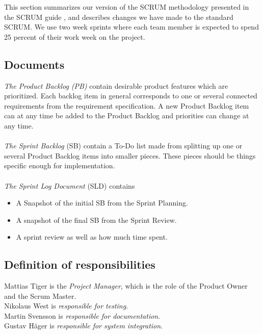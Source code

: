
This section summarizes our version of the SCRUM methodology presented in the SCRUM guide \cite{scrumGuide}, and describes changes we have made to the standard SCRUM. We use two week sprints where each team member is expected to spend 25 percent of their work week on the project.   

\subsection{Documents}
\emph{The Product Backlog (PB)} contain desirable product features which are prioritized. Each backlog item in general corresponds to one or several connected requirements from the requirement specification.
A new Product Backlog item can at any time be added to the Product Backlog and priorities can change at any time. \\
\\
\emph{The Sprint Backlog} (SB) contain a To-Do list made from splitting up one or several Product Backlog items into smaller pieces. These pieces should be things specific enough for implementation. \\
\\
\emph{The Sprint Log Document} (SLD) contains
\begin{itemize}
  \item A Snapshot of the initial SB from the Sprint Planning.
  \item A snapshot of the final SB from the Sprint Review.
  \item A sprint review as well as how much time spent.
\end{itemize} 

\subsection{Definition of responsibilities}
Mattias Tiger is the \emph{Project Manager}, which is the role of the Product Owner and the Scrum Master.\\
Nikolaus West is \emph{responsible for testing}.\\
Martin Svensson is \emph{responsible for documentation}.\\
Gustav Häger is \emph{responsible for system integration}. 

\newpage
